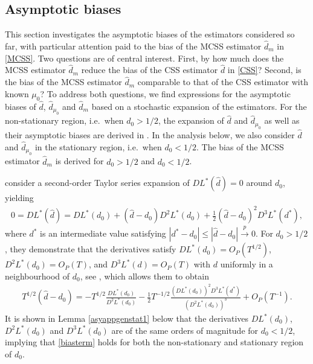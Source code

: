 {{\subsection{Asymptotic biases} \label{S3}


This section investigates the asymptotic biases of the estimators considered so far, with particular attention paid to the bias of the MCSS estimator $\hat{d}_m$ in \eqref{MCSS}. Two questions are of central interest. First, by how much does the MCSS estimator $\hat{d}_m$ reduce the bias of the CSS estimator $\hat{d}$ in \eqref{CSS}? Second, is the bias of the MCSS estimator $\hat d_m$ comparable to that of the CSS estimator with known $\mu_0$? To address both questions, we find expressions for the asymptotic biases of $\hat{d}$, $\hat{d}_{\mu_0}$ and $\hat{d}_m$ based on a stochastic expansion of the estimators. For the non-stationary region, i.e.\ when $d_0 > 1/2$, the expansion of $\hat{d}$ and $\hat{d}_{\mu_0}$ as well as their asymptotic biases are derived in \textcite{johansen2016role}. In the analysis below, we also consider $\hat{d}$ and $\hat{d}_{\mu_0}$ in the stationary region, i.e.\ when $d_0 < 1/2$. The bias of the MCSS estimator $\hat{d}_m$ is derived for $d_0 > 1/2$ and $d_0 < 1/2$. 

\textcite[Section 3.2]{johansen2016role} consider a second-order Taylor series expansion of $DL^*(\hat{d}) = 0$ around $d_0$, yielding
\begin{align}
    0 = DL^*(\hat{d}) = DL^*(d_0) + (\hat{d} - d_0) D^2L^*(d_0) + \frac{1}{2} (\hat{d} - d_0)^2 D^3L^*(d^*), \label{mn1}
\end{align}
where $d^*$ is an intermediate value satisfying $|d^*-d_0| \leq |\hat{d}-d_0| \overset{p}{\rightarrow} 0$. For $d_0 > 1/2$, they demonstrate that the derivatives satisfy $DL^*(d_0) = O_P(T^{1/2})$, $D^2L^*(d_0) = O_P(T)$, and $D^3L^*(d) = O_P(T)$ with $d$ uniformly in a neighbourhood of $d_0$, see \textcite[Lemma B.4]{johansen2016role}, which allows them to obtain  
\begin{align}
    T^{1/2}\left(\hat{d}-d_0\right) =  - T^{1/2} \frac{DL^*(d_0)}{D^2L^*(d_0)} - \frac{1}{2} T^{-1/2}\frac{\left(DL^*(d_0)\right)^2 D^3L^*(d^*)}{\left(D^2L^*(d_0)\right)^3} + O_P(T^{-1}). \label{biasterm}
\end{align}
It is shown in Lemma \ref{asyappgenstat1} below that the derivatives $DL^*(d_0)$, $D^2L^*(d_0)$ and $D^3L^*(d_0)$ are of the same orders of magnitude for $d_0 < 1/2$, implying that \eqref{biasterm} holds for both the non-stationary and stationary region of $d_0$.

}}
